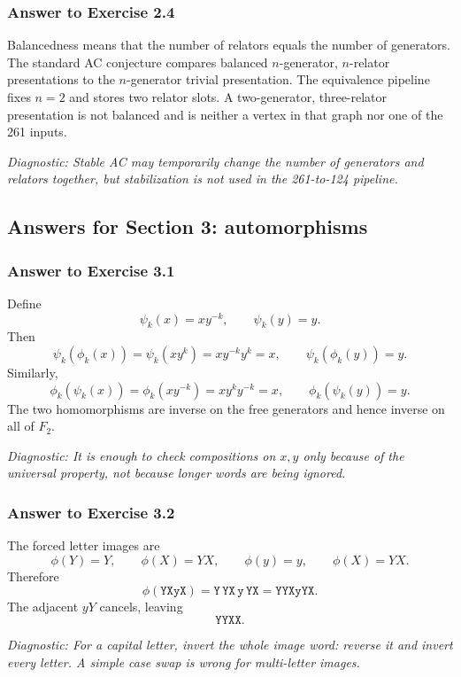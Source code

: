 \documentclass[11pt]{article}
\theoremstyle{definition}
\theoremstyle{remark}
\newcommand{\F}{F_2}
\newcommand{\diagnostic}[1]{\par\smallskip\textit{Diagnostic: #1}}
\begin{document}
\subsubsection*{Answer to Exercise 2.4}

Balancedness means that the number of relators equals the number of
generators.  The standard AC conjecture compares balanced \(n\)-generator,
\(n\)-relator presentations to the \(n\)-generator trivial presentation.
The equivalence pipeline fixes \(n=2\) and stores two relator slots.  A
two-generator, three-relator presentation is not balanced and is neither a
vertex in that graph nor one of the 261 inputs.

\diagnostic{Stable AC may temporarily change the number of generators and
relators together, but stabilization is not used in the 261-to-124
pipeline.}

\subsection*{Answers for Section 3: automorphisms}

\subsubsection*{Answer to Exercise 3.1}

Define
\[
\psi_k(x)=xy^{-k},\qquad\psi_k(y)=y.
\]
Then
\[
\psi_k(\phi_k(x))=\psi_k(xy^k)=xy^{-k}y^k=x,
\qquad
\psi_k(\phi_k(y))=y.
\]
Similarly,
\[
\phi_k(\psi_k(x))=\phi_k(xy^{-k})=xy^ky^{-k}=x,
\qquad
\phi_k(\psi_k(y))=y.
\]
The two homomorphisms are inverse on the free generators and hence inverse
on all of \(\F\).

\diagnostic{It is enough to check compositions on \(x,y\) only because of
the universal property, not because longer words are being ignored.}

\subsubsection*{Answer to Exercise 3.2}

The forced letter images are
\[
\phi(Y)=Y,\qquad \phi(X)=YX,\qquad
\phi(y)=y,\qquad \phi(X)=YX.
\]
Therefore
\[
\phi(\texttt{YXyX})
=\texttt{Y}\,\texttt{YX}\,\texttt{y}\,\texttt{YX}
=\texttt{YYXyYX}.
\]
The adjacent \(yY\) cancels, leaving
\[
\boxed{\texttt{YYXX}}.
\]

\diagnostic{For a capital letter, invert the whole image word: reverse it
and invert every letter.  A simple case swap is wrong for multi-letter
images.}
\end{document}
